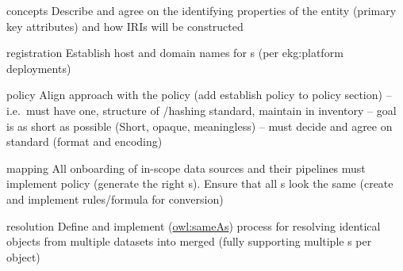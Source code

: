 \ekgmmCapabilitySectionLevelsOneFive

\ekgmmscoringlevelOne

\begin{scoring}

  \item [concepts] Describe and agree on the identifying properties of the entity (primary key
        attributes) and how IRIs will be constructed
  \item [registration] Establish host and domain names for s (per \gls{ekg:platform} deployments)
  \item [policy] Align approach with the  policy (add establish policy to policy section) --
        i.e.\ must have one, structure of /hashing standard, maintain in inventory --
        goal is as short as possible (Short, opaque, meaningless) --
        must decide and agree on standard (format and encoding)
  \item [mapping] All onboarding of in-scope data sources and their  pipelines must implement policy
        (generate the right s).
        Ensure that all s look the same (create and implement rules/formula for conversion)
  \item [resolution] Define and implement (\href{https://www.w3.org/TR/owl-ref/\#sameAs-def}{owl:sameAs}) process for
        resolving identical objects from multiple datasets into merged  (fully supporting
        multiple s per object)

\end{scoring}

\ekgmmscoringlevelTwo

